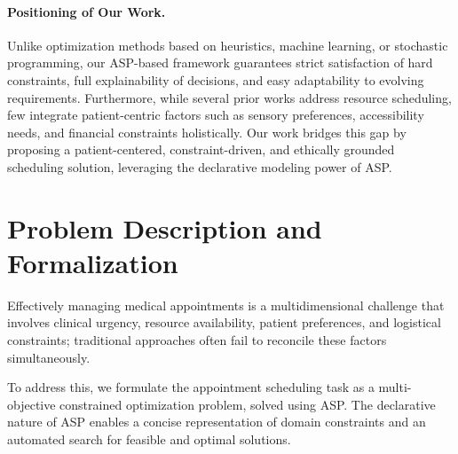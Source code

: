 \documentclass{tlp}
\begin{document}
\paragraph{Positioning of Our Work.}
Unlike optimization methods based on heuristics, machine learning, or stochastic programming, our ASP-based framework guarantees strict satisfaction of hard constraints, full explainability of decisions, and easy adaptability to evolving requirements. Furthermore, while several prior works address resource scheduling, few integrate patient-centric factors such as sensory preferences, accessibility needs, and financial constraints holistically. Our work bridges this gap by proposing a patient-centered, constraint-driven, and ethically grounded scheduling solution, leveraging the declarative modeling power of ASP.




\vspace{-0.5cm}
\section{Problem Description and Formalization}
\label{problem-description}

Effectively managing medical appointments is a multidimensional challenge that involves clinical urgency, resource availability, patient preferences, and logistical constraints; traditional approaches often fail to reconcile these factors simultaneously.

To address this, we formulate the appointment scheduling task as a multi-objective constrained optimization problem, solved using ASP. The declarative nature of ASP enables a concise representation of domain constraints and an automated search for feasible and optimal solutions.
\end{document}
